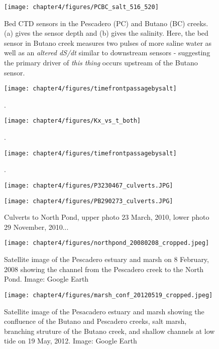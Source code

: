 \begin{figure}
	\texttt{[image: chapter4/figures/PCBC\_salt\_516\_520]}
	\caption{Bed CTD sensors in the Pescadero (PC) and Butano (BC) creeks. (a) gives the sensor depth and (b) gives the salinity. Here, the bed sensor in Butano creek measures two pulses of more saline water as well as an \emph{altered dS/dt} similar to downstream sensors - suggesting the primary driver of \emph{this thing} occurs upstream of the Butano sensor.}  \label{fig:PCBC511:516}
\end{figure}


\begin{figure}
	\texttt{[image: chapter4/figures/timefrontpassagebysalt]}
	\caption{.}  \label{fig:tvsS}
\end{figure}



\begin{figure}
	\texttt{[image: chapter4/figures/Kx\_vs\_t\_both]}
	\caption{.}  \label{fig:tvsS}
\end{figure}



\begin{figure}
	\texttt{[image: chapter4/figures/timefrontpassagebysalt]}
	\caption{.}  \label{fig:tvsS}
\end{figure}




\begin{figure}
\centering
	\texttt{[image: chapter4/figures/P3230467\_culverts.JPG]}

	\texttt{[image: chapter4/figures/PB290273\_culverts.JPG]}

\caption{Culverts to North Pond, upper photo 23 March, 2010, lower photo 29 November, 2010... } \label{fig:photoCulverts}
\end{figure}





\begin{figure}
\centering
	\texttt{[image: chapter4/figures/northpond\_20080208\_cropped.jpeg]}
	\caption{Satellite image of the Pescadero estuary and marsh on 8 February, 2008 showing the channel from the Pescadero creek to the North Pond. Image: Google Earth} \label{fig:geNP}
\end{figure}


\begin{figure}
\centering
	\texttt{[image: chapter4/figures/marsh\_conf\_20120519\_cropped.jpeg]}
	\caption{Satellite image of the Pesacadero estuary and marsh showing the confluence of the Butano and Pescadero creeks, salt marsh, branching struture of the Butano creek, and shallow channels at low tide on 19 May, 2012. Image: Google Earth} \label{fig:geMarsh}
\end{figure}
